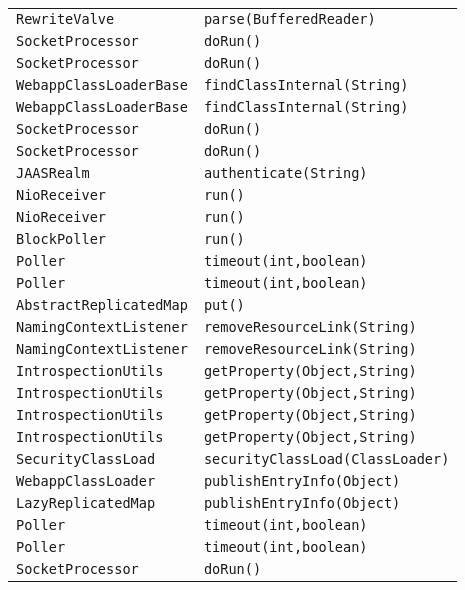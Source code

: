 \begin{center}
\begin{longtable}{ll}
\lstinline/RewriteValve/&{\lstinline/parse(BufferedReader)/}\\
\lstinline/SocketProcessor/&{\lstinline/doRun()/}\\
\lstinline/SocketProcessor/&{\lstinline/doRun()/}\\
\lstinline/WebappClassLoaderBase/&{\lstinline/findClassInternal(String)/}\\
\lstinline/WebappClassLoaderBase/&{\lstinline/findClassInternal(String)/}\\
\lstinline/SocketProcessor/&{\lstinline/doRun()/}\\
\lstinline/SocketProcessor/&{\lstinline/doRun()/}\\
\lstinline/JAASRealm/&{\lstinline/authenticate(String)/}\\
\lstinline/NioReceiver/&{\lstinline/run()/}\\
\lstinline/NioReceiver/&{\lstinline/run()/}\\
\lstinline/BlockPoller/&{\lstinline/run()/}\\
\lstinline/Poller/&{\lstinline/timeout(int,boolean)/}\\
\lstinline/Poller/&{\lstinline/timeout(int,boolean)/}\\
\lstinline/AbstractReplicatedMap/&{\lstinline/put()/}\\
\lstinline/NamingContextListener/&{\lstinline/removeResourceLink(String)/}\\
\lstinline/NamingContextListener/&{\lstinline/removeResourceLink(String)/}\\
\lstinline/IntrospectionUtils/&{\lstinline/getProperty(Object,String)/}\\
\lstinline/IntrospectionUtils/&{\lstinline/getProperty(Object,String)/}\\
\lstinline/IntrospectionUtils/&{\lstinline/getProperty(Object,String)/}\\
\lstinline/IntrospectionUtils/&{\lstinline/getProperty(Object,String)/}\\
\lstinline/SecurityClassLoad/&{\lstinline/securityClassLoad(ClassLoader)/}\\
\lstinline/WebappClassLoader/&{\lstinline/publishEntryInfo(Object)/}\\
\lstinline/LazyReplicatedMap/&{\lstinline/publishEntryInfo(Object)/}\\
\lstinline/Poller/&{\lstinline/timeout(int,boolean)/}\\
\lstinline/Poller/&{\lstinline/timeout(int,boolean)/}\\
\lstinline/SocketProcessor/&{\lstinline/doRun()/}\\

\end{longtable}
\end{center}
